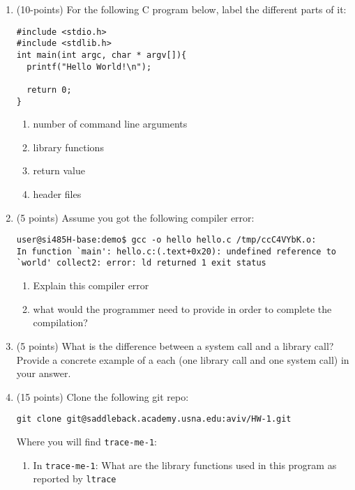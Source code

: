 \documentclass{article}[9pt]
\begin{document}
\begin{enumerate}
\item (10-points) For the following C program below, label the different parts of it:
\begin{verbatim}
#include <stdio.h>
#include <stdlib.h>
int main(int argc, char * argv[]){
  printf("Hello World!\n");

  return 0;
}
\end{verbatim}
\begin{enumerate}
\item number of command line arguments

\item library functions

\item return value

\item header files
\end{enumerate}

\item (5 points) Assume you got the following compiler error:
\begin{verbatim}
user@si485H-base:demo$ gcc -o hello hello.c /tmp/ccC4VYbK.o:
In function `main': hello.c:(.text+0x20): undefined reference to `world' collect2: error: ld returned 1 exit status
\end{verbatim}

\begin{enumerate}
\item Explain this compiler error

\item what would the programmer need to provide in order to complete the compilation?
\end{enumerate}

\item (5 points) What is the difference between a system call and a library call?
Provide a concrete example of a each (one library call and one
system call) in your answer.

\item (15 points) Clone the following git repo:
\begin{verbatim}
git clone git@saddleback.academy.usna.edu:aviv/HW-1.git
\end{verbatim}
Where you will find \texttt{trace-me-1}:

\begin{enumerate}
\item In \texttt{trace-me-1}: What are the library functions used in this program as reported by \texttt{ltrace}


\end{enumerate}
\end{enumerate}
\end{document}
